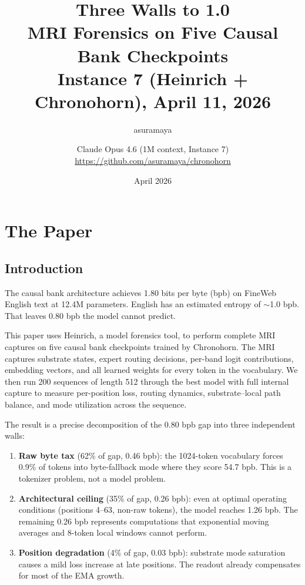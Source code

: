 \documentclass[11pt,a4paper]{report}
\title{Three Walls to 1.0\\[0.5em]\large MRI Forensics on Five Causal Bank Checkpoints\\Instance 7 (Heinrich + Chronohorn), April 11, 2026}
\author{asuramaya \and Claude Opus 4.6 (1M context, Instance 7)\\[0.3em]\small \url{https://github.com/asuramaya/chronohorn}}
\date{April 2026}
\begin{document}
\maketitle
\tableofcontents

\part{The Paper}

\chapter{Introduction}

The causal bank architecture achieves 1.80 bits per byte (bpb) on FineWeb English text at 12.4M parameters. English has an estimated entropy of $\sim$1.0 bpb. That leaves 0.80 bpb the model cannot predict.

This paper uses Heinrich, a model forensics tool, to perform complete MRI captures on five causal bank checkpoints trained by Chronohorn. The MRI captures substrate states, expert routing decisions, per-band logit contributions, embedding vectors, and all learned weights for every token in the vocabulary. We then run 200 sequences of length 512 through the best model with full internal capture to measure per-position loss, routing dynamics, substrate--local path balance, and mode utilization across the sequence.

The result is a precise decomposition of the 0.80 bpb gap into three independent walls:

\begin{enumerate}
\item \textbf{Raw byte tax} (62\% of gap, 0.46 bpb): the 1024-token vocabulary forces 0.9\% of tokens into byte-fallback mode where they score 54.7 bpb. This is a tokenizer problem, not a model problem.
\item \textbf{Architectural ceiling} (35\% of gap, 0.26 bpb): even at optimal operating conditions (positions 4--63, non-raw tokens), the model reaches 1.26 bpb. The remaining 0.26 bpb represents computations that exponential moving averages and 8-token local windows cannot perform.
\item \textbf{Position degradation} (4\% of gap, 0.03 bpb): substrate mode saturation causes a mild loss increase at late positions. The readout already compensates for most of the EMA growth.
\end{enumerate}
\end{document}
